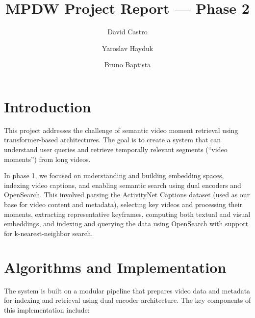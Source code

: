 \documentclass[runningheads]{llncs}
\begin{document}
\raggedbottom
\sloppy

\setlength{\textfloatsep}{10pt plus 2pt minus 4pt}
\setlength{\intextsep}{10pt plus 2pt minus 4pt}

\title{MPDW Project Report --- Phase 2}
\author{David Castro \and
Yaroslav Hayduk \and
Bruno Baptista}
%
%
%
\maketitle              %
%


%
%
%
\vspace{2\baselineskip plus 0.5\baselineskip minus 0.5\baselineskip}

\section{Introduction}
This project addresses the challenge of semantic video moment retrieval using transformer-based architectures. The goal is to create a system that can understand user queries and retrieve temporally relevant segments (``video moments'') from long videos.

In phase 1, we focused on understanding and building embedding spaces, indexing video captions, and enabling semantic search using dual encoders and OpenSearch. This involved parsing the \href{https://huggingface.co/datasets/HuggingFaceM4/ActivitiyNet_Captions}{ActivityNet Captions dataset} (used as our base for video content and metadata), selecting key videos and processing their moments, extracting representative keyframes, computing both textual and visual embeddings, and indexing and querying the data using OpenSearch with support for k-nearest-neighbor search.

\vspace{2\baselineskip plus 0.5\baselineskip minus 0.5\baselineskip} %

\section{Algorithms and Implementation}
The system is built on a modular pipeline that prepares video data and metadata for indexing and retrieval using dual encoder architecture. The key components of this implementation include:
\end{document}
